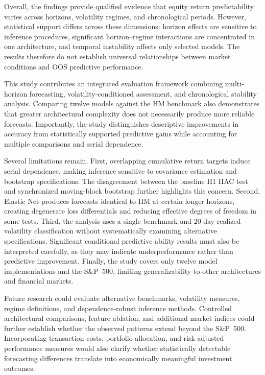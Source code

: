 \documentclass[12pt,twoside]{ord}
\begin{document}
Overall, the findings provide qualified evidence that equity return predictability varies across horizons, volatility regimes, and chronological periods. However, statistical support differs across these dimensions: horizon effects are sensitive to inference procedures, significant horizon--regime interactions are concentrated in one architecture, and temporal instability affects only selected models. The results therefore do not establish universal relationships between market conditions and OOS predictive performance.

This study contributes an integrated evaluation framework combining multi-horizon forecasting, volatility-conditioned assessment, and chronological stability analysis. Comparing twelve models against the HM benchmark also demonstrates that greater architectural complexity does not necessarily produce more reliable forecasts. Importantly, the study distinguishes descriptive improvements in accuracy from statistically supported predictive gains while accounting for multiple comparisons and serial dependence.

Several limitations remain. First, overlapping cumulative return targets induce serial dependence, making inference sensitive to covariance estimation and bootstrap specifications. The disagreement between the baseline H1 HAC test and synchronized moving-block bootstrap further highlights this concern. Second, Elastic Net produces forecasts identical to HM at certain longer horizons, creating degenerate loss differentials and reducing effective degrees of freedom in some tests. Third, the analysis uses a single benchmark and 20-day realized volatility classification without systematically examining alternative specifications. Significant conditional predictive ability results must also be interpreted carefully, as they may indicate underperformance rather than predictive improvement. Finally, the study covers only twelve model implementations and the S\&P~500, limiting generalizability to other architectures and financial markets.

Future research could evaluate alternative benchmarks, volatility measures, regime definitions, and dependence-robust inference methods. Controlled architectural comparisons, feature ablation, and additional market indices could further establish whether the observed patterns extend beyond the S\&P~500. Incorporating transaction costs, portfolio allocation, and risk-adjusted performance measures would also clarify whether statistically detectable forecasting differences translate into economically meaningful investment outcomes.



\end{document}
